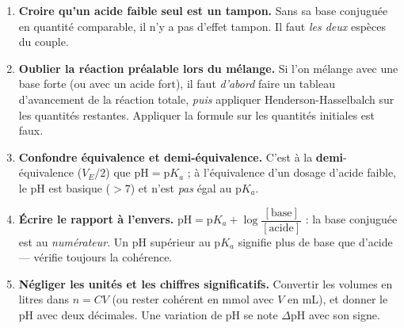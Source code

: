 \documentclass[11pt]{article}
\begin{document}
\begin{attention}
\begin{enumerate}
\item \textbf{Croire qu'un acide faible seul est un tampon.} Sans sa base conjuguée en quantité comparable, il n'y a pas d'effet tampon. Il faut \emph{les deux} espèces du couple.
\item \textbf{Oublier la réaction préalable lors du mélange.} Si l'on mélange  avec une base forte (ou  avec un acide fort), il faut \emph{d'abord} faire un tableau d'avancement de la réaction totale, \emph{puis} appliquer Henderson-Hasselbalch sur les quantités restantes. Appliquer la formule sur les quantités initiales est faux.
\item \textbf{Confondre équivalence et demi-équivalence.} C'est à la \textbf{demi}-équivalence ($V_E/2$) que $\text{pH} = \text{p}K_a$ ; à l'équivalence d'un dosage d'acide faible, le pH est basique ($> 7$) et n'est \emph{pas} égal au $\text{p}K_a$.
\item \textbf{Écrire le rapport à l'envers.} $\text{pH} = \text{p}K_a + \log\dfrac{[\text{base}]}{[\text{acide}]}$ : la base conjuguée est au \emph{numérateur}. Un pH supérieur au $\text{p}K_a$ signifie plus de base que d'acide — vérifie toujours la cohérence.
\item \textbf{Négliger les unités et les chiffres significatifs.} Convertir les volumes en litres dans $n = CV$ (ou rester cohérent en \si{mmol} avec $V$ en \si{mL}), et donner le pH avec deux décimales. Une variation de pH se note $\Delta\text{pH}$ avec son signe.
\end{enumerate}
\end{attention}
\end{document}

